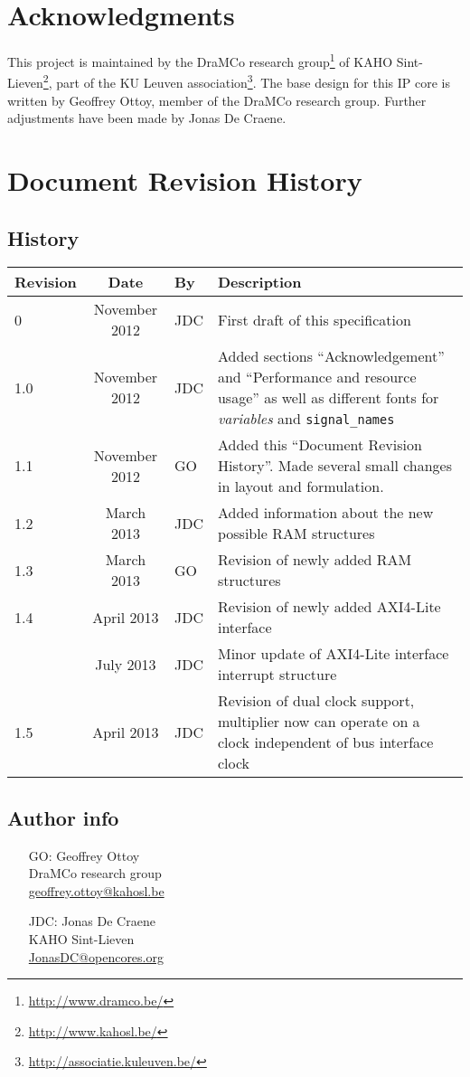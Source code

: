 \chapter*{Acknowledgments}
This project is maintained by the DraMCo research group\footnote{\url{http://www.dramco.be/}} of KAHO Sint-Lieven\footnote{\url{http://www.kahosl.be/}}, part of the KU Leuven association\footnote{\url{http://associatie.kuleuven.be/}}.
The base design for this IP core is written by Geoffrey Ottoy, member of the DraMCo research group. Further adjustments have been made by Jonas De Craene.


\chapter*{Document Revision History} 

\section*{History}
\begin{tabular}{|l|c|l|p{10cm}|}
	\hline
	\rowcolor{Gray}
	\textbf{Revision} & \textbf{Date} & \textbf{By} & \textbf{Description} \\
	\hline
	0	& November 2012	& JDC	& First draft of this specification\\
	\hline
	1.0 & November 2012	& JDC	& Added sections ``Acknowledgement'' and ``Performance and resource usage'' as well as different fonts for \textit{variables} and \verb|signal_names|\\
	\hline
	1.1 & November 2012	& GO	& Added this ``Document Revision History''. Made several small changes in layout and formulation.\\
	\hline
	1.2 & March 2013	& JDC	& Added information about the new possible RAM structures\\
	\hline
	1.3 & March 2013	& GO	& Revision of newly added RAM structures\\
	\hline
	1.4	& April 2013	& JDC	& Revision of newly added AXI4-Lite interface\\
	\hline
		& July 2013		& JDC	& Minor update of AXI4-Lite interface interrupt structure\\
	\hline
	1.5	& April 2013	& JDC	& Revision of dual clock support, multiplier now can operate on a clock independent of bus interface clock\\
	\hline
\end{tabular}%

\section*{Author info}

\begin{itemize}
\item[GO:] Geoffrey Ottoy\\DraMCo research group\\\url{geoffrey.ottoy@kahosl.be}
\item[JDC:] Jonas De Craene\\KAHO Sint-Lieven\\\url{JonasDC@opencores.org}
\end{itemize}